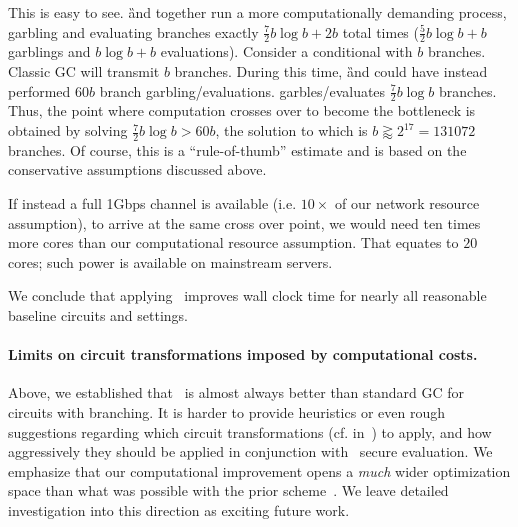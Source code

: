 This is easy to see.
\G and \E together 
run a more computationally demanding  process, garbling and evaluating 
branches exactly $\frac{7}{2} b \log b + 2b$ total times ($\frac{5}{2} b \log b + b$ garblings and $ b \log b + b$  evaluations).  Consider a
conditional with $b$ branches.  Classic GC will transmit $b$ branches.
During this time, \G and \E could have instead performed $60 b$ branch garbling/evaluations. 
\ourschemelong  garbles/evaluates $\frac{7}{2} b \log b$ branches.  Thus,  the point where
computation crosses over to become the bottleneck is obtained by
solving $\frac{7}{2}b \log b > 60 b$, the solution to which is $b \gtrapprox 2^{17} = 131072$
branches.  Of course, this is a ``rule-of-thumb'' estimate and is based on the conservative assumptions discussed above.

If instead a full 1Gbps channel is available (i.e. $10\times$ of our network resource assumption),  to arrive at the same cross over  point, we would need ten times more cores than our computational resource assumption.  That equates to $20$ cores; such power is available on mainstream servers.

We conclude that applying \ourschemelong\ improves wall clock
time for nearly all reasonable baseline circuits and settings.


\paragraph{Limits on circuit transformations imposed by computational costs.}
Above, we established that \ourschemelong\ is almost always
better than standard GC for circuits with branching.
%
It is harder to provide heuristics or
even rough suggestions regarding which circuit transformations (cf.
in~) to apply, and how aggressively
they should be applied in conjunction with \ourschemelong\ secure evaluation.  We
emphasize that our computational improvement opens
a {\em much} wider optimization space than what was possible with the
prior scheme~\HK.  We leave detailed investigation into this direction
as exciting future work.





